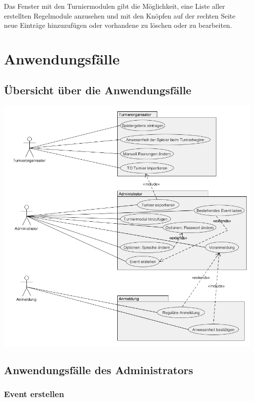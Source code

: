 \documentclass[11pt]{article}
\begin{document}
\vspace{1cm}

Das Fenster mit den Turniermodulen gibt die Möglichkeit, eine Liste aller erstellten Regelmodule anzusehen und mit den Knöpfen auf der rechten Seite neue Einträge hinzuzufügen oder vorhandene zu löschen oder zu bearbeiten.

\section{Anwendungsfälle}

\subsection{Übersicht über die Anwendungsfälle}

\includegraphics[width=\textwidth]{UseCaseDiagram.png}

\newpage

\subsection{Anwendungsfälle des Administrators}

\subsubsection{Event erstellen}
\end{document}
